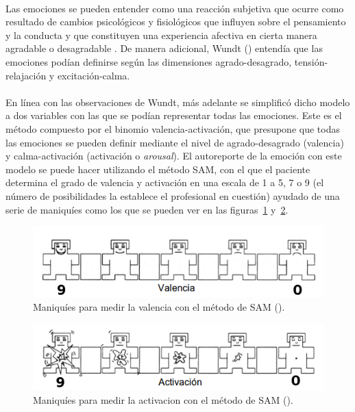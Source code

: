 \paragraph{}
Las emociones se pueden entender como una reacción subjetiva que ocurre como resultado de cambios psicológicos y fisiológicos que influyen sobre el pensamiento y la conducta \citep{psicoemocional} y que constituyen una experiencia afectiva en cierta manera agradable o desagradable \citep{montanes2005psicologia}. De manera adicional, Wundt (\citeyear{wundt1896lectures}) entendía que las emociones podían definirse según las dimensiones agrado-desagrado, tensión-relajación y excitación-calma.

\paragraph{}
En línea con las observaciones de Wundt, más adelante se simplificó dicho modelo a dos variables con las que se podían representar todas las emociones. Este es el método compuesto por el binomio valencia-activación, que presupone que todas las emociones se pueden definir mediante el nivel de agrado-desagrado (valencia) y calma-activación (activación o \textit{arousal}). El autoreporte de la emoción con este modelo se puede hacer utilizando el método \ac{SAM}, con el que el paciente determina el grado de valencia y activación en una escala de 1 a 5, 7 o 9 (el número de posibilidades la establece el profesional en cuestión) ayudado de una serie de maniquíes como los que se pueden ver en las figuras~\ref{fig:valencia-num} y~\ref{fig:activacion-num}.

\begin{figure}[h]
    \centering
    \includegraphics[scale=0.75]{Imagenes/valencia-num}
    \caption[Maniquíes para medir la valencia con el método de SAM extraídos del texto de Hernández (\citeyear{hernandez2016clasificacion}).]{Maniquíes para medir la valencia con el método de SAM (\citep{hernandez2016clasificacion}).}
    \label{fig:valencia-num}
\end{figure}

\begin{figure}[h]
    \centering
    \includegraphics[scale=0.75]{Imagenes/activacion-num}
    \caption[Maniquíes para medir la activación con el método de SAM extraídos del texto de Hernández (\citeyear{hernandez2016clasificacion}).]{Maniquíes para medir la activacion con el método de SAM (\citep{hernandez2016clasificacion}).}
    \label{fig:activacion-num}
\end{figure}


